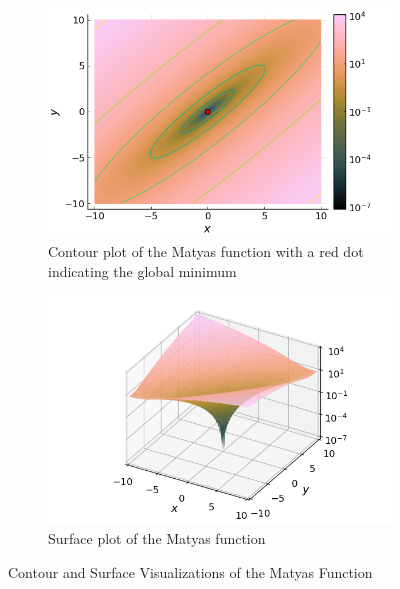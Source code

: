   \begin{figure}[ht!]
    \centering
    \begin{subfigure}[b]{0.45\textwidth}
      \centering
      \includegraphics[width=\textwidth]{img/test_functions/matyas_contour.png}
      \caption{
        Contour plot of the Matyas function with a red dot indicating the global
        minimum
      }
      \label{fig:app:test:matyas:contour}
    \end{subfigure}
    \hfill
    \begin{subfigure}[b]{0.45\textwidth}
      \centering
      \includegraphics[width=\textwidth]{img/test_functions/matyas_surface.png}
      \caption{Surface plot of the Matyas function}
      \label{fig:app:test:matyas:surface}
    \end{subfigure}
    \caption{Contour and Surface Visualizations of the Matyas Function}
    \label{fig:app:test:matyas}
  \end{figure}

